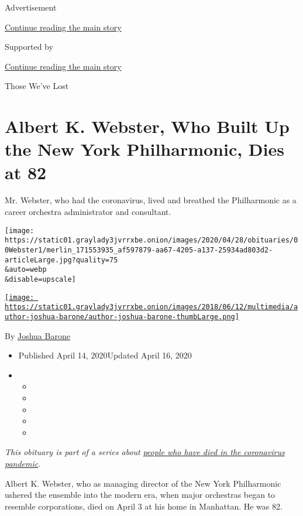 Advertisement

\protect\hyperlink{after-top}{Continue reading the main story}

Supported by

\protect\hyperlink{after-sponsor}{Continue reading the main story}

Those We've Lost

\hypertarget{albert-k-webster-who-built-up-the-new-york-philharmonic-dies-at-82}{%
\section{Albert K. Webster, Who Built Up the New York Philharmonic, Dies
at
82}\label{albert-k-webster-who-built-up-the-new-york-philharmonic-dies-at-82}}

Mr. Webster, who had the coronavirus, lived and breathed the
Philharmonic as a career orchestra administrator and consultant.

\texttt{[image: https://static01.graylady3jvrrxbe.onion/images/2020/04/28/obituaries/00Webster1/merlin\_171553935\_af597879-aa67-4205-a137-25934ad803d2-articleLarge.jpg?quality=75\\\&auto=webp\\\&disable=upscale]}

\href{https://www.nytimes3xbfgragh.onion/by/joshua-barone}{\texttt{[image: https://static01.graylady3jvrrxbe.onion/images/2018/06/12/multimedia/author-joshua-barone/author-joshua-barone-thumbLarge.png]}}

By \href{https://www.nytimes3xbfgragh.onion/by/joshua-barone}{Joshua
Barone}

\begin{itemize}
\item
  Published April 14, 2020Updated April 16, 2020
\item
  \begin{itemize}
  \item
  \item
  \item
  \item
  \item
  \end{itemize}
\end{itemize}

\emph{This obituary is part of a series about}
\href{https://www.nytimes3xbfgragh.onion/series/people-who-have-died-of-the-coronavirus}{\emph{people
who have died in the coronavirus pandemic}}\emph{.}

Albert K. Webster, who as managing director of the New York Philharmonic
ushered the ensemble into the modern era, when major orchestras began to
resemble corporations, died on April 3 at his home in Manhattan. He was
82.


